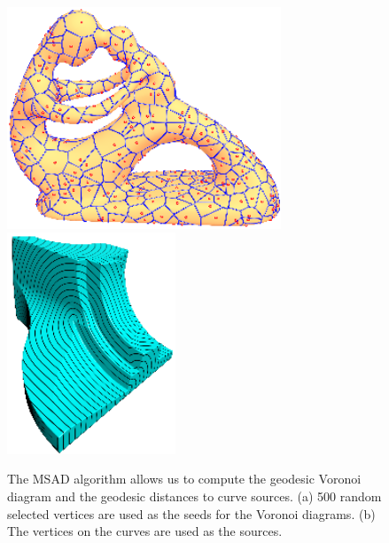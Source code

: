 \begin{figure}[htbp]
\centering
\includegraphics[height=2.6in]{figs/svg/GVD/fertility_nf60k_voronoi_500.png}
\includegraphics[height=2.6in]{figs/svg/offset/fandisk.png}\\
 
\caption{The MSAD algorithm allows us to compute the geodesic
Voronoi diagram and the geodesic distances to curve sources. (a) 500
random selected vertices are used as the seeds for the Voronoi
diagrams. (b) The vertices on the curves are used as the sources.}
\label{fig:gvd}
\end{figure}


